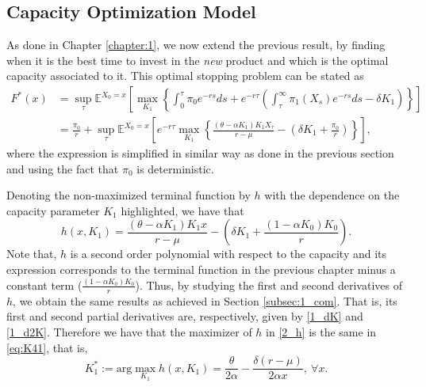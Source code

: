 \subsection{Capacity Optimization Model}
\label{subsec:2_com}

As done in Chapter \ref{chapter:1}, we now extend the previous result, by finding when it is the best time to invest in the \textit{new} product and
which is the optimal capacity associated to it.
This optimal stopping problem can be stated as
\begin{align}
F^*(x)&=\sup _\tau \mathds{E}^{X_0=x} \left[ \max_{K_1} \left\{ \int_0^\tau \pi_0e^{-rs} ds + e^{-r\tau} \left( \int_\tau^\infty \pi_1(X_s)e^{-rs}ds -\delta K_1 \right) \right\} \right] \nonumber \\
&= \frac{\pi_0}{r}+ \sup _\tau \mathds{E}^{X_0=x} \left[ e^{-r\tau} \max_{K_1}   \left\{ \frac{(\theta-\alpha K_1)K_1X_\tau}{r-\mu} - \left( \delta K_1  +\frac{\pi_0}{r}\right)   \right\} \right],
\label{eq:o2}
\end{align}
where the expression is simplified in similar way as done in the previous section and using the fact that $\pi_0$ is deterministic.

Denoting the non-maximized terminal function by $h$ with the dependence on the capacity parameter $K_1$ highlighted, we have that
\begin{equation}
h(x,K_1)= \frac{(\theta-\alpha K_1)K_1 x}{r-\mu} - \left( \delta K_1  +\frac{(1-\alpha K_0) K_0}{r}\right).
\label{2_h}
\end{equation}
Note that, $h$ is a second order polynomial with respect to the capacity and its expression corresponds to the terminal function in the previous chapter minus a constant term ($\frac{(1-\alpha K_0) K_0}{r}$). Thus, by studying the first and second derivatives of $h$, we obtain the same results as achieved in Section \ref{subsec:1_com}. That is, its first and second partial derivatives are, respectively, given by \eqref{1_dK} and \eqref{1_d2K}. Therefore we have that the maximizer of $h$ in \eqref{2_h} is the same in \eqref{eq:K41}, that is,
\begin{equation}
K^*_1:=\text{arg} \max_{K_1} h(x,K_1) = \frac{\theta}{2\alpha}-\frac{\delta (r-\mu)}{2 \alpha x}, \ \forall x.
\label{eq:Kopt2}
\end{equation}

